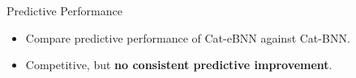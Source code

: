\begin{frame}{Predictive Performance}
\label{frm:single-prediction}
\begin{itemize}
\item Compare predictive performance of Cat-eBNN against Cat-BNN.
\end{itemize}
\begin{center}
\small
\renewcommand{\arraystretch}{1.18}

\end{center}
\begin{itemize}
\setlength{\itemsep}{3mm}
\item Competitive, but \textbf{no consistent predictive improvement}. 
\end{itemize}
\end{frame}

